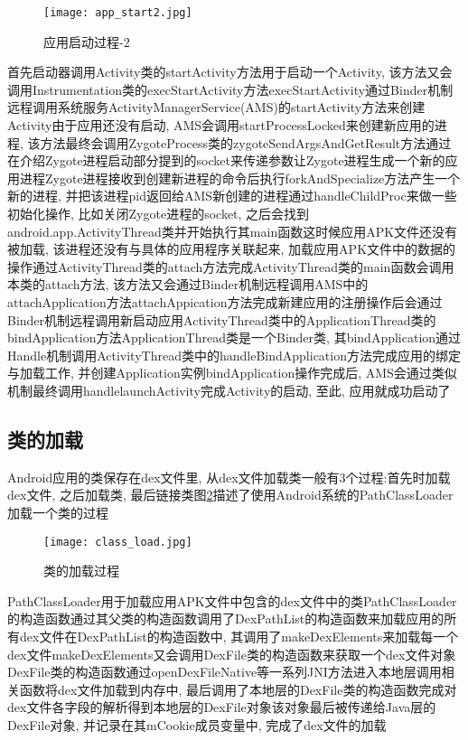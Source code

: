 \begin{figure}[ht]
	\centering
	\texttt{[image: app\_start2.jpg]}
	\caption{应用启动过程-2}
	\label{appStart2}
\end{figure}
首先启动器调用Activity类的startActivity方法用于启动一个Activity, 该方法又会调用Instrumentation类的execStartActivity方法\juhao  execStartActivity通过Binder机制远程调用系统服务ActivityManagerService(AMS)的startActivity方法来创建Activity\juhao 由于应用还没有启动, AMS会调用startProcessLocked来创建新应用的进程, 该方法最终会调用ZygoteProcess类的zygoteSendArgsAndGetResult方法通过在介绍Zygote进程启动部分提到的socket来传递参数让Zygote进程生成一个新的应用进程\juhao Zygote进程接收到创建新进程的命令后执行forkAndSpecialize方法产生一个新的进程, 并把该进程pid返回给AMS\juhao 新创建的进程通过handleChildProc来做一些初始化操作, 比如关闭Zygote进程的socket, 之后会找到android.app.ActivityThread类并开始执行其main函数\juhao 这时候应用APK文件还没有被加载, 该进程还没有与具体的应用程序关联起来, 加载应用APK文件中的数据的操作通过ActivityThread类的attach方法完成\juhao ActivityThread类的main函数会调用本类的attach方法, 该方法又会通过Binder机制远程调用AMS中的attachApplication方法\juhao attachAppication方法完成新建应用的注册操作后会通过Binder机制远程调用新启动应用ActivityThread类中的ApplicationThread类的bindApplication方法\juhao ApplicationThread类是一个Binder类, 其bindApplication通过Handle机制调用ActivityThread类中的handleBindApplication方法完成应用的绑定与加载工作, 并创建Application实例\juhao bindApplication操作完成后, AMS会通过类似机制最终调用handlelaunchActivity完成Activity的启动, 至此, 应用就成功启动了\juhao 

\subsection{类的加载}
\label{classLoadA}
Android应用的类保存在dex文件里, 从dex文件加载类一般有3个过程:首先时加载dex文件, 之后加载类, 最后链接类\juhao 图\ref{classLoad}描述了使用Android系统的PathClassLoader加载一个类的过程\juhao 
\begin{figure}[ht]
	\centering
	\texttt{[image: class\_load.jpg]}
	\caption{类的加载过程}
	\label{classLoad}
\end{figure}
PathClassLoader用于加载应用APK文件中包含的dex文件中的类\juhao PathClassLoader的构造函数通过其父类的构造函数调用了DexPathList的构造函数来加载应用的所有dex文件\juhao 在DexPathList的构造函数中, 其调用了makeDexElements来加载每一个dex文件\juhao makeDexElements又会调用DexFile类的构造函数来获取一个dex文件对象\juhao DexFile类的构造函数通过openDexFileNative等一系列JNI方法进入本地层调用相关函数将dex文件加载到内存中, 最后调用了本地层的DexFile类的构造函数完成对dex文件各字段的解析得到本地层的DexFile对象\juhao 该对象最后被传递给Java层的DexFile对象, 并记录在其mCookie成员变量中, 完成了dex文件的加载\juhao

